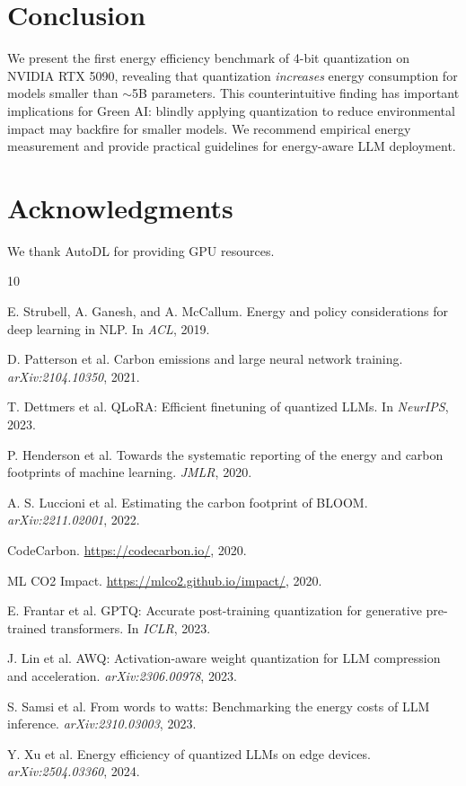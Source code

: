 \documentclass[11pt]{article}
\begin{document}
\section{Conclusion}

We present the first energy efficiency benchmark of 4-bit quantization on NVIDIA RTX 5090, revealing that quantization \textit{increases} energy consumption for models smaller than $\sim$5B parameters. This counterintuitive finding has important implications for Green AI: blindly applying quantization to reduce environmental impact may backfire for smaller models. We recommend empirical energy measurement and provide practical guidelines for energy-aware LLM deployment.

\section*{Acknowledgments}

We thank AutoDL for providing GPU resources.


\begin{thebibliography}{10}

E. Strubell, A. Ganesh, and A. McCallum.
\newblock Energy and policy considerations for deep learning in NLP.
\newblock In \emph{ACL}, 2019.

D. Patterson et al.
\newblock Carbon emissions and large neural network training.
\newblock \emph{arXiv:2104.10350}, 2021.

T. Dettmers et al.
\newblock QLoRA: Efficient finetuning of quantized LLMs.
\newblock In \emph{NeurIPS}, 2023.

P. Henderson et al.
\newblock Towards the systematic reporting of the energy and carbon footprints of machine learning.
\newblock \emph{JMLR}, 2020.

A. S. Luccioni et al.
\newblock Estimating the carbon footprint of BLOOM.
\newblock \emph{arXiv:2211.02001}, 2022.

CodeCarbon.
\newblock \url{https://codecarbon.io/}, 2020.

ML CO2 Impact.
\newblock \url{https://mlco2.github.io/impact/}, 2020.

E. Frantar et al.
\newblock GPTQ: Accurate post-training quantization for generative pre-trained transformers.
\newblock In \emph{ICLR}, 2023.

J. Lin et al.
\newblock AWQ: Activation-aware weight quantization for LLM compression and acceleration.
\newblock \emph{arXiv:2306.00978}, 2023.

S. Samsi et al.
\newblock From words to watts: Benchmarking the energy costs of LLM inference.
\newblock \emph{arXiv:2310.03003}, 2023.

Y. Xu et al.
\newblock Energy efficiency of quantized LLMs on edge devices.
\newblock \emph{arXiv:2504.03360}, 2024.

\end{thebibliography}
\end{document}
